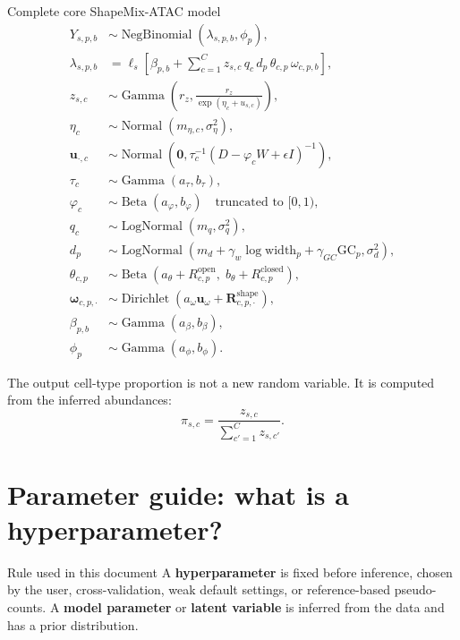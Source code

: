 \documentclass[11pt]{article}
\newcommand{\NB}{\operatorname{NegBinomial}}
\newcommand{\Dir}{\operatorname{Dirichlet}}
\newcommand{\Gam}{\operatorname{Gamma}}
\newcommand{\Betadist}{\operatorname{Beta}}
\newcommand{\LogNormal}{\operatorname{LogNormal}}
\newcommand{\Normal}{\operatorname{Normal}}
\begin{document}
\begin{mathbox}{Complete core ShapeMix-ATAC model}
\begin{align}
Y_{s,p,b} &\sim \NB(\lambda_{s,p,b},\phi_p), \\
\lambda_{s,p,b}
&= \ell_s\left[\beta_{p,b} + \sum_{c=1}^{C} z_{s,c}\,q_c\,d_p\,\theta_{c,p}\,\omega_{c,p,b}\right], \\
z_{s,c} &\sim \Gam\left(r_z, \frac{r_z}{\exp(\eta_c+u_{s,c})}\right), \\
\eta_c &\sim \Normal(m_{\eta,c},\sigma_{\eta}^{2}), \\
\boldsymbol{u}_{\cdot,c} &\sim \Normal\left(\boldsymbol{0},\tau_c^{-1}(D-\varphi_c W+\epsilon I)^{-1}\right), \\
\tau_c &\sim \Gam(a_{\tau},b_{\tau}), \\
\varphi_c &\sim \Betadist(a_{\varphi},b_{\varphi}) \quad \text{truncated to } [0,1), \\
q_c &\sim \LogNormal(m_q,\sigma_q^2), \\
d_p &\sim \LogNormal(m_d+\gamma_w \log \mathrm{width}_p+\gamma_{GC}\mathrm{GC}_p,\sigma_d^2), \\
\theta_{c,p} &\sim \Betadist(a_{\theta}+R_{c,p}^{\mathrm{open}},\;b_{\theta}+R_{c,p}^{\mathrm{closed}}), \\
\boldsymbol{\omega}_{c,p,\cdot} &\sim \Dir(a_{\omega}\boldsymbol{u}_{\omega}+\boldsymbol{R}^{\mathrm{shape}}_{c,p,\cdot}), \\
\beta_{p,b} &\sim \Gam(a_{\beta},b_{\beta}), \\
\phi_p &\sim \Gam(a_{\phi},b_{\phi}).
\end{align}
\end{mathbox}

The output cell-type proportion is not a new random variable.  It is computed from the inferred abundances:
\[
\pi_{s,c}=\frac{z_{s,c}}{\sum_{c'=1}^{C} z_{s,c'}}.
\]

\section{Parameter guide: what is a hyperparameter?}

\begin{plainbox}{Rule used in this document}
A \textbf{hyperparameter} is fixed before inference, chosen by the user, cross-validation, weak default settings, or reference-based pseudo-counts.  A \textbf{model parameter} or \textbf{latent variable} is inferred from the data and has a prior distribution.
\end{plainbox}
\end{document}
